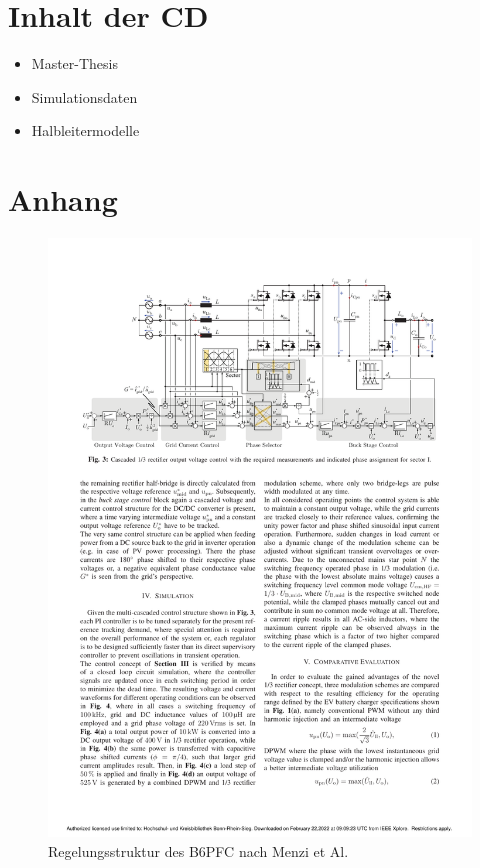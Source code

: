 \chapter{Inhalt der CD}

\begin{itemize}
	\item Master-Thesis
	\item Simulationsdaten
	\item Halbleitermodelle
\end{itemize}

\chapter{Anhang}

\setcounter{figure}{0}
\renewcommand{\thefigure}{A\arabic{figure}}

\setcounter{table}{0}
\renewcommand{\thetable}{A\arabic{table}}

\begin{figure}
	\centering
	\includegraphics[width=0.75\linewidth]{content/Anhang/B6_Regelung}
	\caption{Regelungsstruktur des \gls{B6PFC} nach Menzi et Al. \cite{13PWMPFC}}
	\label{fig:b6regelung}
\end{figure}






